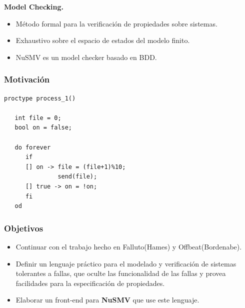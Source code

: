 \documentclass[serif]{beamer}
\begin{document}
\begin{frame}
{\Large \bfseries Model Checking.}
\begin{itemize}\itemsep15pt
\item Método formal para la verificación de propiedades sobre sistemas.
\item Exhaustivo sobre el espacio de estados del modelo finito.
\item NuSMV es un model checker basado en BDD.
\end{itemize}
\end{frame}


\begin{frame}[fragile]
\frametitle{Motivación}
{\fontsize{9pt}{13pt}\selectfont
\hspace{0.2\textwidth}
\begin{minipage}{0.6\textwidth}
\begin{framed}
\begin{verbatim}
proctype process_1()

   int file = 0;
   bool on = false;

   do forever
      if
      [] on -> file = (file+1)%10;
               send(file);
      [] true -> on = !on;
      fi
   od
\end{verbatim}
\end{framed}
\end{minipage}
} %
\end{frame}

\begin{frame}
\frametitle{Objetivos}
\begin{itemize}\itemsep15pt
\item Continuar con el trabajo hecho en Falluto(Hames) y Offbeat(Bordenabe). 
\item Definir un lenguaje práctico para el modelado y verificación de 
sistemas tolerantes a fallas, que oculte las funcionalidad de las 
fallas y provea facilidades para la especificación de propiedades.
\item Elaborar un front-end para \textbf{NuSMV} que use este lenguaje.
\end{itemize}
\end{frame}
\end{document}

